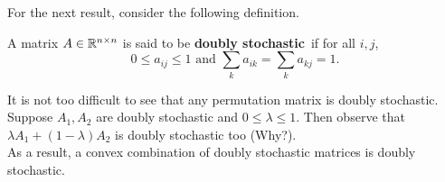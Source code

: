 			For the next result, consider the following definition.

			\begin{fdef}
				A matrix $A\in\mathbb{R}^{n\times n}$ is said to be \textbf{doubly stochastic}\footnotemark\ if for all $i,j$,
				\[ 0\le a_{ij} \le 1 \text{ and } \sum_{k} a_{ik} = \sum_{k} a_{kj} = 1. \]
			\end{fdef}

			It is not too difficult to see that any permutation matrix is doubly stochastic.\\
			Suppose $A_1,A_2$ are doubly stochastic and $0\le\lambda\le 1$. Then observe that $\lambda A_1 + (1-\lambda)A_2$ is doubly stochastic too (Why?).\\
			As a result, a convex combination of doubly stochastic matrices is doubly stochastic.

